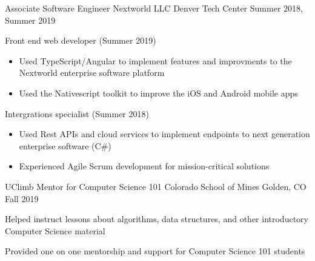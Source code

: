 

\begin{cventries}

  \cventry
    {Associate Software Engineer} %
    {Nextworld LLC} %
    {Denver Tech Center} %
    {Summer 2018, Summer 2019} %
    {
      \begin{cvitems} %
      \item {Front end web developer (Summer 2019)}
      \begin{itemize}
            \item {Used TypeScript/Angular to implement features and
    improvments to the Nextworld enterprise software platform}
        \item {Used the Nativescript toolkit to improve the iOS and
    Android mobile apps}
    \end{itemize}
        \item {Intergrations specialist (Summer 2018)}
        \begin{itemize}
                \item {Used Rest APIs and cloud services to implement
                            endpoints to next generation enterprise software (C\#)}
                                    \item {Experienced Agile Scrum
    development for mission-critical solutions}
    \end{itemize}
      \end{cvitems}
    }
    
    \cventry
    	{UClimb Mentor for Computer Science 101}
    	{ Colorado School of Mines }
    	{ Golden, CO}
	   	 {Fall 2019  }
   	 {
   	 \begin{cvitems}
   	 \item {Helped instruct lessons about algorithms, data structures, and other introductory Computer Science material}
   	 \item {Provided one on one mentorship and support for Computer Science 101 students}
    \end{cvitems}
    }
    

\end{cventries}
